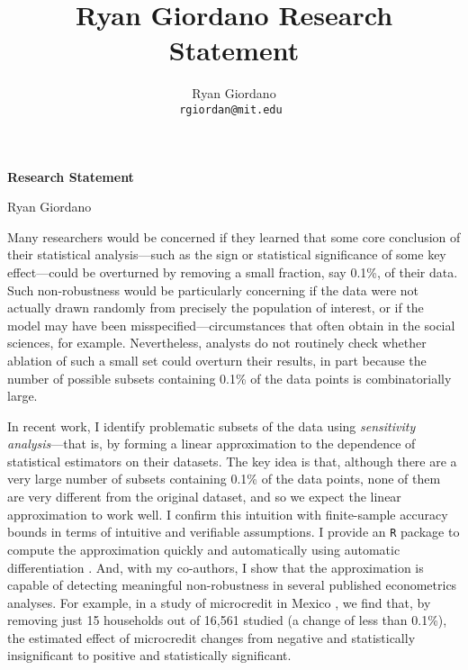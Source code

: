 
\usepackage{enumitem}

\usepackage{geometry}
\geometry{top=0.8in}
\geometry{left=1.1in}
\geometry{right=1.1in}

\title{Ryan Giordano Research Statement}

\author{
  Ryan Giordano \\ \texttt{rgiordan@mit.edu }
}



\begin{minipage}[t]{0.5\textwidth}
\hspace{-2em} %
{\bf \LARGE Research Statement}\\
\end{minipage}
\begin{minipage}[t]{0.5\textwidth}
        \hspace{8em} %
        {\LARGE Ryan Giordano}
\end{minipage}

Many researchers would be concerned if they learned that some core conclusion of
their statistical analysis---such as the sign or statistical significance of some
key effect---could be overturned by removing a small fraction, say 0.1\%, of
their data.  Such non-robustness would be particularly concerning if the data
were not actually drawn randomly from precisely the population of interest, or if
the model may have been misspecified---circumstances that often obtain in  the
social sciences, for example.  Nevertheless, analysts do not routinely check
whether ablation of such a small set could overturn their results, in part
because the number of possible subsets containing 0.1\% of the data points is
combinatorially large.

In recent work, I identify problematic subsets of the data using {\em
sensitivity analysis}---that is, by forming a linear approximation to the
dependence of statistical estimators on their datasets.  The key idea is that,
although there are a very large number of subsets containing 0.1\% of the data
points, none of them are very different from the original dataset, and so we
expect the linear approximation to work well.  I confirm this intuition with
finite-sample accuracy bounds in terms of intuitive and verifiable assumptions.
I provide an \texttt{R} package \citep{zaminfluence} to compute the
approximation quickly and automatically using automatic differentiation
\citep{baydin:2015:automatic, autograd}.  And, with my co-authors, I show that
the approximation is capable of detecting meaningful non-robustness in several
published econometrics analyses. For example, in a study of microcredit in
Mexico \citep{angelucci:2015:microcredit}, we find that, by removing just 15
households out of 16,561 studied (a change of less than 0.1\%), the estimated
effect of microcredit changes from negative and statistically insignificant to
positive and statistically significant.

